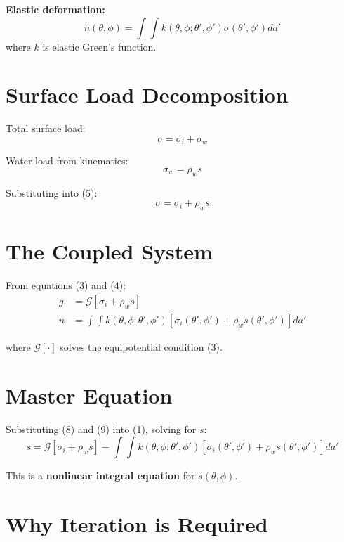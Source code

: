\documentclass{article}
\begin{document}
\textbf{Elastic deformation:}
\begin{equation}
n(\theta,\phi) = \int\int k(\theta,\phi; \theta',\phi') \sigma(\theta',\phi') da'
\end{equation}
where $k$ is elastic Green's function.

\section{Surface Load Decomposition}

Total surface load:
\begin{equation}
\sigma = \sigma_i + \sigma_w
\end{equation}

Water load from kinematics:
\begin{equation}
\sigma_w = \rho_w s
\end{equation}

Substituting into (5):
\begin{equation}
\sigma = \sigma_i + \rho_w s
\end{equation}

\section{The Coupled System}

From equations (3) and (4):
\begin{align}
g &= \mathcal{G}[\sigma_i + \rho_w s] \\
n &= \int\int k(\theta,\phi; \theta',\phi') [\sigma_i(\theta',\phi') + \rho_w s(\theta',\phi')] da'
\end{align}

where $\mathcal{G}[\cdot]$ solves the equipotential condition (3).

\section{Master Equation}

Substituting (8) and (9) into (1), solving for $s$:
\begin{equation}
\boxed{s = \mathcal{G}[\sigma_i + \rho_w s] - \int\int k(\theta,\phi; \theta',\phi') [\sigma_i(\theta',\phi') + \rho_w s(\theta',\phi')] da'}
\end{equation}

This is a \textbf{nonlinear integral equation} for $s(\theta,\phi)$.

\section{Why Iteration is Required}
\end{document}
